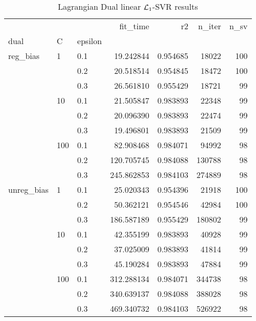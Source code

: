 \begin{table}[H]
\centering
\caption{Lagrangian Dual linear $\protect \mathcal{L}_1$-SVR results}
\label{linear_lagrangian_dual_l1_svr_cv_results}
\begin{tabular}{lllrrrr}
\toprule
           &     &     &    fit\_time &        r2 &  n\_iter &  n\_sv \\
dual & C & epsilon &             &           &         &       \\
\midrule
reg\_bias & 1   & 0.1 &   19.242844 &  0.954685 &   18022 &   100 \\
           &     & 0.2 &   20.518514 &  0.954845 &   18472 &   100 \\
           &     & 0.3 &   26.561810 &  0.955429 &   18721 &    99 \\
           & 10  & 0.1 &   21.505847 &  0.983893 &   22348 &    99 \\
           &     & 0.2 &   20.096390 &  0.983893 &   22474 &    99 \\
           &     & 0.3 &   19.496801 &  0.983893 &   21509 &    99 \\
           & 100 & 0.1 &   82.908468 &  0.984071 &   94992 &    98 \\
           &     & 0.2 &  120.705745 &  0.984088 &  130788 &    98 \\
           &     & 0.3 &  245.862853 &  0.984103 &  274889 &    98 \\
unreg\_bias & 1   & 0.1 &   25.020343 &  0.954396 &   21918 &   100 \\
           &     & 0.2 &   50.362121 &  0.954546 &   42984 &   100 \\
           &     & 0.3 &  186.587189 &  0.955429 &  180802 &    99 \\
           & 10  & 0.1 &   42.355199 &  0.983893 &   40928 &    99 \\
           &     & 0.2 &   37.025009 &  0.983893 &   41814 &    99 \\
           &     & 0.3 &   45.190284 &  0.983893 &   47884 &    99 \\
           & 100 & 0.1 &  312.288134 &  0.984071 &  344738 &    98 \\
           &     & 0.2 &  340.639137 &  0.984088 &  388028 &    98 \\
           &     & 0.3 &  469.340732 &  0.984103 &  526922 &    98 \\
\bottomrule
\end{tabular}
\end{table}
